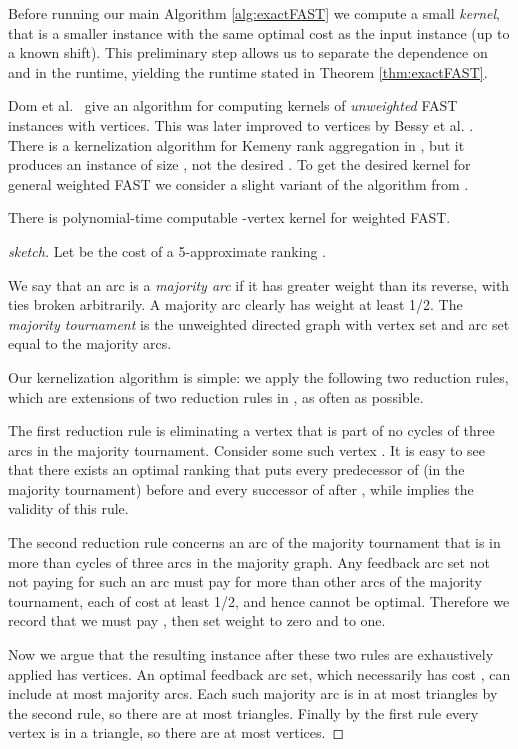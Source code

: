 \documentclass[envcountsame,oribibl]{llncs}
\newcommand{\fast}{\textsc{FAST}}
\begin{document}
\medskip

Before running our main Algorithm \ref{alg:exactFAST} we compute a small \emph{kernel}, that is a smaller instance with the same optimal cost as the input instance (up to a known shift). This preliminary step allows us to separate the dependence on  and  in the runtime, yielding the runtime stated in Theorem \ref{thm:exactFAST}.

Dom et al.\ \cite{Dom06} give an algorithm for computing kernels of \emph{unweighted} FAST instances with  vertices. This was later improved to  vertices by Bessy et al. \cite{Bessy09}. There is a kernelization algorithm for Kemeny rank aggregation in \cite{Betzler09}, but it produces an instance of size , not the desired . To get the desired kernel for general weighted \fast{} we consider a slight variant of the algorithm from \cite{Dom06}.

\begin{lemma}\label{lem:kernel}
There is polynomial-time computable -vertex kernel for weighted FAST. 
\end{lemma}
\begin{proof}[sketch]
Let  be the cost of a 5-approximate ranking \cite{Coppersmith06}.

We say that an arc is a \emph{majority arc} if it has greater weight than its reverse, with ties broken arbitrarily. A majority arc clearly has weight at least 1/2. The \emph{majority tournament} \cite{Ailon08aggregating} is the unweighted directed graph with vertex set  and arc set equal to the majority arcs.

Our kernelization algorithm is simple: we apply the following two reduction rules, which are extensions of two reduction rules in \cite{Dom06}, as often as possible.

The first reduction rule is eliminating a vertex that is part of no cycles of three arcs in the majority tournament. Consider some such vertex . It is easy to see that there exists an optimal ranking that puts every predecessor of  (in the majority tournament) before  and every successor of  after , while implies the validity of this rule.

The second reduction rule concerns an arc  of the majority tournament that is in more than  cycles of three arcs in the majority graph. Any feedback arc set not not paying for such an arc must pay for more than  other arcs of the majority tournament, each of cost at least 1/2, and hence cannot be optimal. Therefore we record that we must pay , then set weight  to zero and  to one.

Now we argue that the resulting instance after these two rules are exhaustively applied has  vertices.
An optimal feedback arc set, which necessarily has cost , can include at most  majority arcs. 
Each such majority arc is in at most  triangles by the second rule, so there are at most  triangles.
Finally by the first rule every vertex is in a triangle, so there are at most  vertices.
\end{proof}
\end{document}
